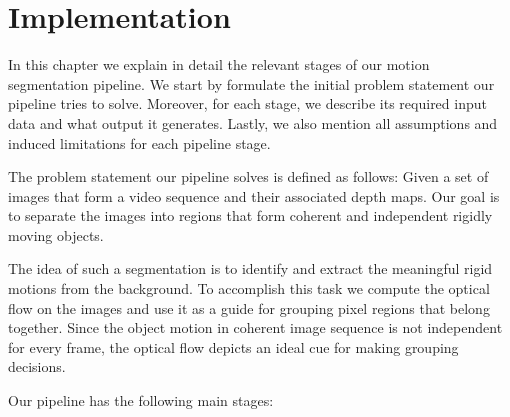 \chapter{Implementation}
In this chapter we explain in detail the relevant stages of our motion segmentation pipeline. We start by formulate the initial problem statement our pipeline tries to solve. Moreover, for each stage, we describe its required input data and what output it generates. Lastly, we also mention all assumptions and induced limitations for each pipeline stage. 

The problem statement our pipeline solves is defined as follows: 
Given a set of images that form a video sequence and their associated depth maps. Our goal is to separate the images into regions that form coherent and independent rigidly moving objects. 


The idea of such a segmentation is to identify and extract the meaningful rigid motions from the background. To accomplish this task we compute the optical flow on the images and use it as a guide for grouping pixel regions that belong together. Since the object motion in coherent image sequence is not independent for every frame, the optical flow depicts an ideal cue for making grouping decisions. 



Our pipeline has the following main stages:

